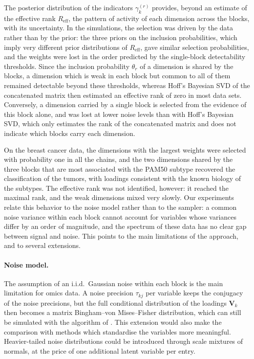 \documentclass[11pt]{article}
\newcommand{\V}{\mathbf{V}}
\newcommand{\Reff}{R_{\mathrm{eff}}}
\begin{document}
The posterior distribution of the indicators $\gamma_k^{(r)}$ provides, beyond an estimate of the effective rank $\Reff$, the pattern of activity of each dimension across the blocks, with its uncertainty. In the simulations, the selection was driven by the data rather than by the prior: the three priors on the inclusion probabilities, which imply very different prior distributions of $\Reff$, gave similar selection probabilities, and the weights were lost in the order predicted by the single-block detectability thresholds. Since the inclusion probability $\theta_r$ of a dimension is shared by the blocks, a dimension which is weak in each block but common to all of them remained detectable beyond these thresholds, whereas Hoff's Bayesian SVD of the concatenated matrix then estimated an effective rank of zero in most data sets. Conversely, a dimension carried by a single block is selected from the evidence of this block alone, and was lost at lower noise levels than with Hoff's Bayesian SVD, which only estimates the rank of the concatenated matrix and does not indicate which blocks carry each dimension.
 
On the breast cancer data, the dimensions with the largest weights were selected with probability one in all the chains, and the two dimensions shared by the three blocks that are most associated with the PAM50 subtype recovered the classification of the tumors, with loadings consistent with the known biology of the subtypes. The effective rank was not identified, however: it reached the maximal rank, and the weak dimensions mixed very slowly. Our experiments relate this behavior to the noise model rather than to the sampler: a common noise variance within each block cannot account for variables whose variances differ by an order of magnitude, and the spectrum of these data has no clear gap between signal and noise. This points to the main limitations of the approach, and to several extensions.
 
\paragraph{Noise model.} The assumption of an i.i.d.\ Gaussian noise within each block is the main limitation for omics data. A noise precision $\tau_{kj}$ per variable keeps the conjugacy of the noise precisions, but the full conditional distribution of the loadings $\V_k$ then becomes a matrix Bingham--von Mises--Fisher distribution, which can still be simulated with the algorithm of \citet{hoff2009}. This extension would also make the comparison with methods which standardise the variables more meaningful. Heavier-tailed noise distributions could be introduced through scale mixtures of normals, at the price of one additional latent variable per entry.
 
\end{document}
